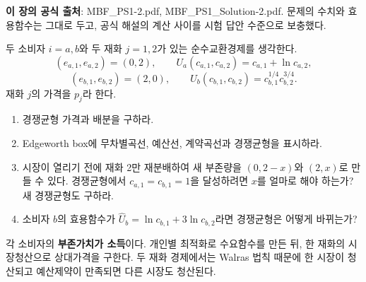 
\begin{sourcebox}
\textbf{이 장의 공식 출처}: MBF\_PS1-2.pdf, MBF\_PS1\_Solution-2.pdf. 문제의 수치와 효용함수는 그대로 두고, 공식 해설의 계산 사이를 시험 답안 수준으로 보충했다.
\end{sourcebox}

\begin{officialbox}
두 소비자 $i=a,b$와 두 재화 $j=1,2$가 있는 순수교환경제를 생각한다.
\[
(e_{a,1},e_{a,2})=(0,2),\qquad U_a(c_{a,1},c_{a,2})=c_{a,1}+\ln c_{a,2},
\]
\[
(e_{b,1},e_{b,2})=(2,0),\qquad U_b(c_{b,1},c_{b,2})=c_{b,1}^{1/4}c_{b,2}^{3/4}.
\]
재화 $j$의 가격을 $p_j$라 한다.
\begin{enumerate}[label=(\alph*)]
\item 경쟁균형 가격과 배분을 구하라.
\item Edgeworth box에 무차별곡선, 예산선, 계약곡선과 경쟁균형을 표시하라.
\item 시장이 열리기 전에 재화 2만 재분배하여 새 부존량을 $(0,2-x)$와 $(2,x)$로 만들 수 있다. 경쟁균형에서 $c_{a,1}=c_{b,1}=1$을 달성하려면 $x$를 얼마로 해야 하는가? 새 경쟁균형도 구하라.
\item 소비자 $b$의 효용함수가 $\widehat U_b=\ln c_{b,1}+3\ln c_{b,2}$라면 경쟁균형은 어떻게 바뀌는가?
\end{enumerate}
\end{officialbox}

\begin{strategybox}
각 소비자의 \textbf{부존가치가 소득}이다. 개인별 최적화로 수요함수를 만든 뒤, 한 재화의 시장청산으로 상대가격을 구한다. 두 재화 경제에서는 Walras 법칙 때문에 한 시장이 청산되고 예산제약이 만족되면 다른 시장도 청산된다.
\end{strategybox}

